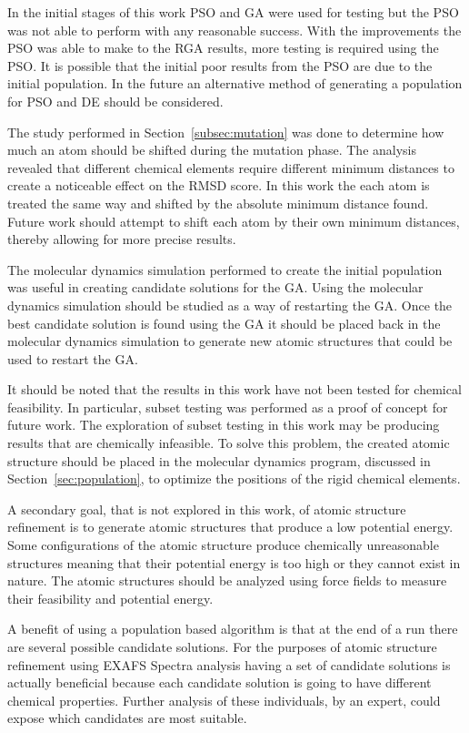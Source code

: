 \documentclass[conference]{IEEEtran}
\begin{document}
In the initial stages of this work PSO and GA were used for testing but the PSO was not able to perform with any reasonable success. With the improvements the PSO was able to make to the RGA results, more testing is required using the PSO. It is possible that the initial poor results from the PSO are due to the initial population. In the future an alternative method of generating a population for PSO and DE should be considered.

The study performed in Section~\ref{subsec:mutation} was done to determine how much an atom should be shifted during the mutation phase. The analysis revealed that different chemical elements require different minimum distances to create a noticeable effect on the RMSD score. In this work the each atom is treated the same way and shifted by the absolute minimum distance found. Future work should attempt to shift each atom by their own minimum distances, thereby allowing for more precise results.

The molecular dynamics simulation performed to create the initial population was useful in creating candidate solutions for the GA. Using the molecular dynamics simulation should be studied as a way of restarting the GA. Once the best candidate solution is found using the GA it should be placed back in the molecular dynamics simulation to generate new atomic structures that could be used to restart the GA.

It should be noted that the results in this work have not been tested for chemical feasibility. In particular, subset testing was performed as a proof of concept for future work. The exploration of subset testing in this work may be producing results that are chemically infeasible. To solve this problem, the created atomic structure should be placed in the molecular dynamics program,  discussed in Section~\ref{sec:population}, to optimize the positions of the rigid chemical elements.

A secondary goal, that is not explored in this work, of atomic structure refinement is to generate atomic structures that produce a low potential energy. Some configurations of the atomic structure produce chemically unreasonable structures meaning that their potential energy is too high or they cannot exist in nature. The atomic structures should be analyzed using force fields to measure their feasibility and potential energy.

A benefit of using a population based algorithm is that at the end of a run there are several possible candidate solutions. For the purposes of atomic structure refinement using EXAFS Spectra analysis having a set of candidate solutions is actually beneficial because each candidate solution is going to have different chemical properties. Further analysis of these individuals, by an expert, could expose which candidates are most suitable.
\end{document}

